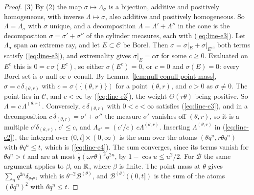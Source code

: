 \begin{proof}
(3) By (2) the map $\sigma \mapsto \Lambda_\sigma$ is a bijection, additive and positively
homogeneous, with inverse $\Lambda \mapsto \sigma$, also additive and positively homogeneous. So
$\Lambda = \Lambda_\sigma$ with $\sigma$ unique, and a decomposition $\Lambda = \Lambda' + \Lambda''$
in the cone is the decomposition $\sigma = \sigma' + \sigma''$ of the cylinder measures, each with
(\ref{eq:line-e3}). Let $\Lambda_\sigma$ span an extreme ray, and let $E \subset \mathcal{C}$ be Borel. Then
$\sigma = \sigma|_E + \sigma|_{E^c}$, both terms satisfy (\ref{eq:line-e3}), and extremality gives
$\sigma|_E = c\sigma$ for some $c \ge 0$. Evaluated on $E^c$ this is $0 = c\,\sigma(E^c)$, so either
$\sigma(E^c) = 0$, or $c = 0$ and $\sigma(E) = 0$: every Borel set is $\sigma$-null or
$\sigma$-conull. By Lemma~\ref{lem:null-conull-point-mass}, $\sigma = c\,\delta_{(\theta,r)}$ with
$c = \sigma(\{(\theta,r)\})$ for a point $(\theta, r)$, and $c > 0$ as $\sigma \ne 0$. The point
lies in $\mathcal{C}$, and $c < \infty$ by (\ref{eq:line-e3}), the weight $\Theta(r\theta)$ being positive. So
$\Lambda = c\,\Lambda^{(\theta,r)}$. Conversely, $c\,\delta_{(\theta,r)}$ with $0 < c < \infty$
satisfies (\ref{eq:line-e3}), and in a decomposition $c\,\delta_{(\theta,r)} = \sigma' + \sigma''$ the measure
$\sigma'$ vanishes off $(\theta, r)$, so it is a multiple $c'\delta_{(\theta,r)}$, $c' \le c$, and
$\Lambda_{\sigma'} = (c'/c)\,c\Lambda^{(\theta,r)}$. Inserting $\Lambda^{(\theta,r)}$ in (\ref{eq:line-e2}), the
integral over $(0,t] \times (0,\infty)$ is the sum over the atoms $(\theta q^n, r\theta q^n)$ with
$\theta q^n \le t$, which is (\ref{eq:line-e4}). The sum converges, since its terms vanish for $\theta q^n > t$
and are at most $\tfrac12(\omega r\theta)^2q^{2n}$, by $1 - \cos u \le u^2/2$. For $\mathcal{B}$ the
same argument applies to $\beta$, on $\mathbb{R}$, where $\beta$ is finite. The point mass at $\theta$
gives $\sum_nq^{2n}\delta_{\theta q^n}$, which is $\theta^{-2}\mathcal{B}^{(\theta)}$, and
$\mathcal{B}^{(\theta)}((0,t])$ is the sum of the atoms $(\theta q^n)^2$ with $\theta q^n \le t$.


\end{proof}
